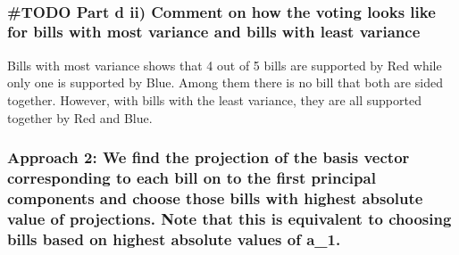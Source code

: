 \documentclass[11pt]{article}
\begin{document}
    \begin{center}
    \end{center}
    { \hspace*{\fill} \\}
    
    \hypertarget{todo-part-d-ii-comment-on-how-the-voting-looks-like-for-bills-with-most-variance-and-bills-with-least-variance}{%
\subsubsection{\#TODO Part d ii) Comment on how the voting looks like
for bills with most variance and bills with least
variance}\label{todo-part-d-ii-comment-on-how-the-voting-looks-like-for-bills-with-most-variance-and-bills-with-least-variance}}

    Bills with most variance shows that 4 out of 5 bills are supported by
Red while only one is supported by Blue. Among them there is no bill
that both are sided together. However, with bills with the least
variance, they are all supported together by Red and Blue.

    \hypertarget{approach-2-we-find-the-projection-of-the-basis-vector-corresponding-to-each-bill-on-to-the-first-principal-components-and-choose-those-bills-with-highest-absolute-value-of-projections.-note-that-this-is-equivalent-to-choosing-bills-based-on-highest-absolute-values-of-a_1.}{%
\subsubsection{Approach 2: We find the projection of the basis vector
corresponding to each bill on to the first principal components and
choose those bills with highest absolute value of projections. Note that
this is equivalent to choosing bills based on highest absolute values of
a\_1.}\label{approach-2-we-find-the-projection-of-the-basis-vector-corresponding-to-each-bill-on-to-the-first-principal-components-and-choose-those-bills-with-highest-absolute-value-of-projections.-note-that-this-is-equivalent-to-choosing-bills-based-on-highest-absolute-values-of-a_1.}}
\end{document}
